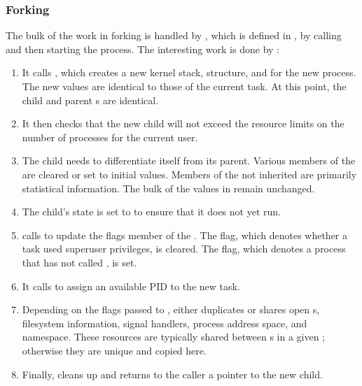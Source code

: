 \subsubsection{Forking}\label{subsubsec:Forking}
The bulk of the work in forking is handled by , which is defined in , by calling  and then starting the process.
The interesting work is done by :
\begin{enumerate}
\item It calls , which creates a new kernel stack,  structure, and  for the new process.
  The new values are identical to those of the current task.
  At this point, the child and parent s are identical.
\item It then checks that the new child will not exceed the resource limits on the number of processes for the current user.
\item The child needs to differentiate itself from its parent.
  Various members of the  are cleared or set to initial values.
  Members of the  not inherited are primarily statistical information.
  The bulk of the values in  remain unchanged.
\item The child’s state is set to  to ensure that it does not yet run.
\item {} calls  to update the flags member of the .
  The  flag, which denotes whether a task used superuser privileges, is cleared.
  The  flag, which denotes a process that has not called , is set.
\item It calls  to assign an available PID to the new task.
\item Depending on the flags passed to ,  either duplicates or shares open s, filesystem information, signal handlers, process address space, and namespace.
  These resources are typically shared between s in a given ; otherwise they are unique and copied here.
\item Finally,  cleans up and returns to the caller a pointer to the new child.
\end{enumerate}

